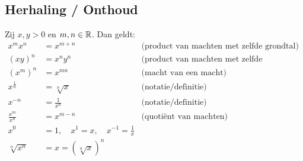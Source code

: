 \documentclass{ximera}
\begin{document}
\subsection{Herhaling / Onthoud }\label{machtenrekenregels}

\begin{proposition}
Zij $x,y>0$ en $m,n\in\mathbb R$. Dan geldt:
\begin{align*}
	x^{m}x^{n}          &= x^{m+n}     & \text{(product van machten met zelfde grondtal)}\\
	(xy)^n              &= x^ny^n      & \text{(product van machten met zelfde exponent)}\\
	\left(x^{m}\right)^{n}&= x^{mn}    & \text{(macht van een macht)}\\	
	x^{\frac1n} &= \sqrt[n] x          & \text{(notatie/definitie)}\\
	x^{-n}          &= \frac{1}{x^n}  & \text{(notatie/definitie)}\\
	\frac{x^{m}}{x^{n}} &= x^{m-n}      & \text{(quotiënt van machten)} \\
	x^0&=1, \quad x^1=x, \quad x^{-1}=\frac1x \\
	\sqrt[n]{x^n} & = x = (\sqrt[n]{x})^n
\end{align*}
\end{proposition}
\end{document}
